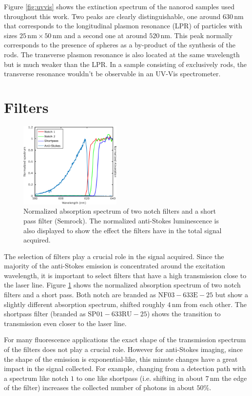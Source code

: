 \documentclass[journal=nalefd,manuscript=letter]{achemso}
\newcommand{\nm}{\ensuremath{\,\textrm{nm}}}
\begin{document}
 Figure \ref{fig:uvvis} shows the extinction spectrum of the nanorod samples
 used throughout this work. Two peaks are clearly distinguishable, one around
 $630\nm$ that corresponds to the longitudinal plasmon resonance (LPR) of
 particles with sizes $25\nm\times50\nm$ and a second one at around $520\nm$.
 This peak normally corresponds to the presence of spheres as a by-product of the
 synthesis of the rods. The transverse plasmon resonance is also located at the
 same wavelength but is much weaker than the LPR. In a sample consisting of
 exclusively rods, the transverse resonance wouldn't be observable in an UV-Vis
 spectrometer.
 
 \section{Filters}

\begin{figure}[htp]
 \centering
 \includegraphics[width=0.45\textwidth]{Figures/Supplementary/03_Filters/filters.png}
 \caption{Normalized absorption spectrum of two notch filters and a short pass
 filter (Semrock). The normalized anti-Stokes luminescence is also displayed to
 show the effect the filters have in the total signal acquired.}
 \label{fig:filters}
 \end{figure}
 
The selection of filters play a crucial role in the signal acquired. Since the
majority of the anti-Stokes emission is concentrated around the excitation
wavelength, it is important to select filters that have a high transmission
close to the laser line. Figure \ref{fig:filters} shows the normalized
absorption spectrum of two notch filters and a short pass. Both notch are
branded as $\textrm{NF}03-633\textrm{E}-25$ but show a slightly different
absorption spectrum, shifted roughly $4\nm$ from each other. The shortpass
filter (branded as $\textrm{SP}01-633\textrm{RU}-25$) shows the transition to
transmission even closer to the laser line. 

For many fluorescence applications the exact shape of the transmission
spectrum of the filters does not play a crucial role. However for anti-Stokes
imaging, since the shape of the emission is exponential-like, this minute
changes have a great impact in the signal collected. For example, changing from
a detection path with a spectrum like notch $1$ to one like shortpass (i.e.
shifting in about $7\nm$ the edge of the filter) increases the collected number
of photons in about $50\%$. 
\end{document}
